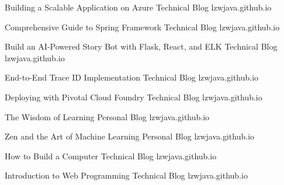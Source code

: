 

\begin{cventries}

  \cventry
    {Building a Scalable Application on Azure} %
    {Technical Blog} %
    {lzwjava.github.io} %
    {} %
    {
    }

  \cventry
    {Comprehensive Guide to Spring Framework} %
    {Technical Blog} %
    {lzwjava.github.io} %
    {} %
    {
    }

  \cventry
    {Build an AI-Powered Story Bot with Flask, React, and ELK} %
    {Technical Blog} %
    {lzwjava.github.io} %
    {} %
    {
    }

  \cventry
    {End-to-End Trace ID Implementation} %
    {Technical Blog} %
    {lzwjava.github.io} %
    {} %
    {
    }

  \cventry
    {Deploying with Pivotal Cloud Foundry} %
    {Technical Blog} %
    {lzwjava.github.io} %
    {} %
    {
    }

  \cventry
    {The Wisdom of Learning} %
    {Personal Blog} %
    {lzwjava.github.io} %
    {} %
    {
    }

  \cventry
    {Zen and the Art of Machine Learning} %
    {Personal Blog} %
    {lzwjava.github.io} %
    {} %
    {
    }

  \cventry
    {How to Build a Computer} %
    {Technical Blog} %
    {lzwjava.github.io} %
    {} %
    {
    }

  \cventry
    {Introduction to Web Programming} %
    {Technical Blog} %
    {lzwjava.github.io} %
    {} %
    {
    }


\end{cventries}
